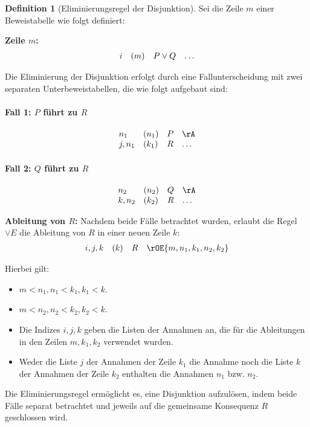 \documentclass{book}
\theoremstyle{plain}
\theoremstyle{remark}
\theoremstyle{definition}
\newtheorem{definition}{Definition}[section]
\begin{document}
\begin{definition}[Eliminierungsregel der Disjunktion]
Sei die Zeile \(m\) einer Beweistabelle wie folgt definiert:

\textbf{Zeile \(m\):}
\[
\begin{array}{l l l l}
    i & (m) & P \lor Q & \dots \\
\end{array}
\]

Die Eliminierung der Disjunktion erfolgt durch eine Fallunterscheidung mit zwei separaten Unterbeweistabellen, die wie folgt aufgebaut sind:

\paragraph{Fall 1: \(P\) führt zu \(R\)}
\[
\begin{array}{l l l l}
    n_1 & (n_1) & P & \rA \\
    j,n_1 & (k_1) & R & \dots \\
\end{array}
\]

\paragraph{Fall 2: \(Q\) führt zu \(R\)}
\[
\begin{array}{l l l l}
    n_2 & (n_2) & Q & \rA \\
    k,n_2 & (k_2) & R & \dots \\
\end{array}
\]

\textbf{Ableitung von \(R\):}
Nachdem beide Fälle betrachtet wurden, erlaubt die Regel \(\lor E\) die Ableitung von \(R\) in einer neuen Zeile \(k\):
\[
\begin{array}{l l l l}
    i,j,k & (k) & R & \rOE{m,n_1,k_1,n_2,k_2} \\
\end{array}
\]

Hierbei gilt:
\begin{itemize}
    \item \(m < n_1, n_1 < k_1, k_1 < k\).
    \item \(m < n_2, n_2 < k_2, k_2 < k\).
    \item Die Indizes \(i, j, k\) geben die Listen der Annahmen an, die für die Ableitungen in den Zeilen \(m, k_1, k_2\) verwendet wurden.
    \item Weder die Liste \(j\) der Annahmen der Zeile \(k_1\) die Annahme noch die Liste \(k\) der Annahmen der Zeile \(k_2\) enthalten die Annahmen \(n_1\) bzw. \(n_2\).
\end{itemize}

Die Eliminierungsregel ermöglicht es, eine Disjunktion aufzulösen, indem beide Fälle separat betrachtet und jeweils auf die gemeinsame Konsequenz \(R\) geschlossen wird.
\end{definition}
\end{document}

